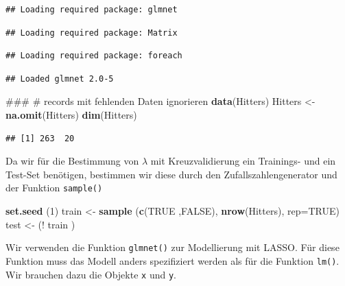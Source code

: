 \documentclass[]{book}
\newenvironment{Shaded}{\begin{snugshade}}{\end{snugshade}}
\newcommand{\KeywordTok}[1]{\textcolor[rgb]{0.13,0.29,0.53}{\textbf{{#1}}}}
\newcommand{\DataTypeTok}[1]{\textcolor[rgb]{0.13,0.29,0.53}{{#1}}}
\newcommand{\DecValTok}[1]{\textcolor[rgb]{0.00,0.00,0.81}{{#1}}}
\newcommand{\StringTok}[1]{\textcolor[rgb]{0.31,0.60,0.02}{{#1}}}
\newcommand{\OtherTok}[1]{\textcolor[rgb]{0.56,0.35,0.01}{{#1}}}
\newcommand{\NormalTok}[1]{{#1}}
\begin{document}
\begin{verbatim}
## Loading required package: glmnet
\end{verbatim}

\begin{verbatim}
## Loading required package: Matrix
\end{verbatim}

\begin{verbatim}
## Loading required package: foreach
\end{verbatim}

\begin{verbatim}
## Loaded glmnet 2.0-5
\end{verbatim}

\begin{Shaded}
\begin{Highlighting}[]
\NormalTok{### # records mit fehlenden Daten ignorieren}
\KeywordTok{data}\NormalTok{(Hitters)}
\NormalTok{Hitters <-}\StringTok{ }\KeywordTok{na.omit}\NormalTok{(Hitters)}
\KeywordTok{dim}\NormalTok{(Hitters)}
\end{Highlighting}
\end{Shaded}

\begin{verbatim}
## [1] 263  20
\end{verbatim}

Da wir für die Bestimmung von \(\lambda\) mit Kreuzvalidierung ein
Trainings- und ein Test-Set benötigen, bestimmen wir diese durch den
Zufallszahlengenerator und der Funktion \texttt{sample()}

\begin{Shaded}
\begin{Highlighting}[]
\KeywordTok{set.seed} \NormalTok{(}\DecValTok{1}\NormalTok{)}
\NormalTok{train <-}\StringTok{ }\KeywordTok{sample} \NormalTok{(}\KeywordTok{c}\NormalTok{(}\OtherTok{TRUE} \NormalTok{,}\OtherTok{FALSE}\NormalTok{), }\KeywordTok{nrow}\NormalTok{(Hitters), }\DataTypeTok{rep=}\OtherTok{TRUE}\NormalTok{)}
\NormalTok{test  <-}\StringTok{ }\NormalTok{(!}\StringTok{ }\NormalTok{train )}
\end{Highlighting}
\end{Shaded}

Wir verwenden die Funktion \texttt{glmnet()} zur Modellierung mit LASSO.
Für diese Funktion muss das Modell anders spezifiziert werden als für
die Funktion \texttt{lm()}. Wir brauchen dazu die Objekte \texttt{x} und
\texttt{y}.

\begin{Shaded}
\end{Shaded}
\end{document}
